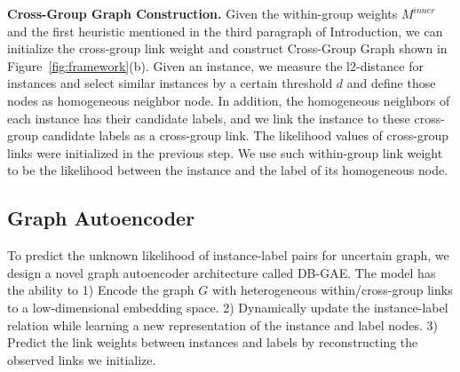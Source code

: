 \documentclass[letterpaper]{article} \usepackage{aaai20}  \usepackage{times}  \usepackage{helvet} \usepackage{courier}  \usepackage[hyphens]{url}  \usepackage{graphicx} \urlstyle{rm} \def\UrlFont{\rm}  \frenchspacing  \setlength{\pdfpagewidth}{8.5in}  \setlength{\pdfpageheight}{11in}  \frenchspacing
\begin{document}
\noindent\textbf{Cross-Group Graph Construction.}
Given the within-group weights $M^{inner}$ and the first heuristic mentioned in the third paragraph of Introduction, we can initialize the cross-group link weight and construct Cross-Group Graph shown in Figure~\ref{fig:framework}(b).
Given an instance, 
we measure the l2-distance for instances
and select similar instances by a certain threshold $d$ and define those nodes as homogeneous neighbor node. In addition, the homogeneous neighbors of each instance has their candidate labels, and we link the instance to these cross-group candidate labels as a cross-group link. The likelihood values of cross-group links were initialized in the previous step. 
We use such within-group link weight to be the likelihood between the instance and the label of its homogeneous node.

\subsection{Graph Autoencoder}  

To predict the unknown likelihood of instance-label pairs for uncertain graph, we design a novel graph autoencoder architecture called DB-GAE. The model has the ability to 1) Encode the graph $G$ with heterogeneous within/cross-group links to a low-dimensional embedding space. 2) Dynamically update the instance-label relation while learning a new representation of the instance and label nodes. 3) Predict the link weights between instances and labels by reconstructing the observed links we initialize.
\end{document}
